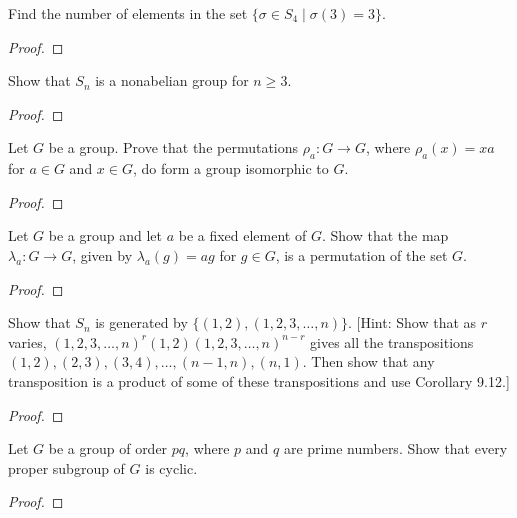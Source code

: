 \begin{theorem}[Exercise 9]\label{Ex9}
    Find the number of elements in the set $\{\sigma \in S_4 \mid \sigma(3) = 3\}$.
\end{theorem}
\begin{proof}

\end{proof}

\begin{theorem}[Exercise 10]\label{Ex10}
    Show that $S_n$ is a nonabelian group for $n \geq 3$.
\end{theorem}
\begin{proof}

\end{proof}

\begin{theorem}[Exercise 11]\label{Ex11}
    Let $G$ be a group. Prove that the permutations $\rho_a : G \to G$, where $\rho_a(x) = xa$ for $a \in G$ and $x \in G$, do form a group isomorphic to $G$.
\end{theorem}
\begin{proof}

\end{proof}

\begin{theorem}[Exercise 12]\label{Ex12}
\leanok
    Let $G$ be a group and let $a$ be a fixed element of $G$. Show that the map $\lambda_a : G \to G$, given by $\lambda_a(g) = ag$ for $g \in G$, is a permutation of the set $G$.
\end{theorem}
\begin{proof}
    \leanok
\end{proof}

\begin{theorem}[Exercise 13]\label{Ex13}
    Show that $S_n$ is generated by $\{(1, 2), (1, 2, 3, \ldots, n)\}$. [Hint: Show that as $r$ varies, $(1, 2, 3, \ldots, n)^r(1, 2)(1, 2, 3, \ldots, n)^{n-r}$ gives all the transpositions $(1, 2), (2, 3), (3, 4), \ldots, (n-1, n), (n, 1)$. Then show that any transposition is a product of some of these transpositions and use Corollary 9.12.]
\end{theorem}
\begin{proof}

\end{proof}

\begin{theorem}[Exercise 14]\label{Ex14}
    Let $G$ be a group of order $pq$, where $p$ and $q$ are prime numbers. Show that every proper subgroup of $G$ is cyclic.
\end{theorem}
\begin{proof}

\end{proof}

